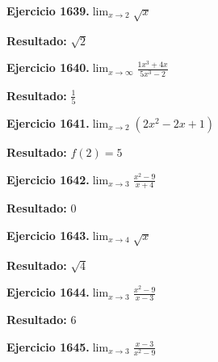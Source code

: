 \documentclass[10pt,a4paper]{article}
\begin{document}
\newpage
\begin{ejbox}
\textbf{Ejercicio 1639.}\quad $\lim_{x\to 2} \sqrt{x}$
\end{ejbox}

\begin{solbox}
\textbf{Resultado:} \(\displaystyle \sqrt{2}\)
\end{solbox}

\begin{ejbox}
\textbf{Ejercicio 1640.}\quad $\lim_{x\to \infty} \frac{1x^3 + 4x}{5x^3 - 2}$
\end{ejbox}

\begin{solbox}
\textbf{Resultado:} \(\displaystyle \frac{1}{5}\)
\end{solbox}

\begin{ejbox}
\textbf{Ejercicio 1641.}\quad $\lim_{x\to 2} (2x^2 -2x +1)$
\end{ejbox}

\begin{solbox}
\textbf{Resultado:} \(\displaystyle f(2) = 5\)
\end{solbox}

\newpage
\begin{ejbox}
\textbf{Ejercicio 1642.}\quad $\lim_{x\to 3} \frac{x^2-9}{x+4}$
\end{ejbox}

\begin{solbox}
\textbf{Resultado:} \(\displaystyle 0\)
\end{solbox}

\begin{ejbox}
\textbf{Ejercicio 1643.}\quad $\lim_{x\to 4} \sqrt{x}$
\end{ejbox}

\begin{solbox}
\textbf{Resultado:} \(\displaystyle \sqrt{4}\)
\end{solbox}

\begin{ejbox}
\textbf{Ejercicio 1644.}\quad $\lim_{x\to 3} \frac{x^2-9}{x-3}$
\end{ejbox}

\begin{solbox}
\textbf{Resultado:} \(\displaystyle 6\)
\end{solbox}

\newpage
\begin{ejbox}
\textbf{Ejercicio 1645.}\quad $\lim_{x\to 3} \frac{x-3}{x^2-9}$
\end{ejbox}
\end{document}
